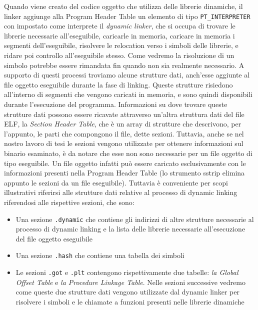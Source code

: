 Quando viene creato del codice oggetto che utilizza delle librerie
dinamiche, il linker aggiunge alla Program Header Table un elemento di
tipo \lstinline{PT_INTERPRETER} con impostato come interprete il
\emph{dynamic linker}, che si occupa di trovare le librerie necessarie
all'eseguibile, caricarle in memoria, caricare in memoria i segmenti
dell'eseguibile, risolvere le relocation verso i simboli delle
librerie, e ridare poi controllo all'eseguibile stesso. Come vedremo
la risoluzione di un simbolo potrebbe essere rimandata fin quando non
sia realmente necessario. A supporto di questi processi troviamo
alcune strutture dati, anch'esse aggiunte al file oggetto eseguibile
durante la fase di linking. Queste strutture risiedono all'interno di
segmenti che vengono caricati in memoria, e sono quindi disponibili
durante l'esecuzione del programma. Informazioni su dove trovare
queste strutture dati possono essere ricavate attraverso un'altra
struttura dati del file ELF, la \emph{Section Header Table}, che è un
array di strutture che descrivono, per l'appunto, le parti che
compongono il file, dette sezioni. Tuttavia, anche se nel nostro
lavoro di tesi le sezioni vengono utilizzate per ottenere informazioni
sul binario esaminato, è da notare che esse non sono necessarie per un
file oggetto di tipo eseguibile. Un file oggetto infatti può essere
caricato esclusivamente con le informazioni presenti nella Program
Header Table (lo strumento sstrip\cite{sstrip} elimina appunto le
sezioni da un file eseguibile). Tuttavia è conveniente per scopi
illustrativi riferirsi alle strutture dati relative al processo di
dynamic linking riferendosi alle rispettive sezioni, che sono:

\begin{itemize}

  \item Una sezione \lstinline{.dynamic} che contiene gli indirizzi di
    altre strutture necessarie al processo di dynamic linking e la
    lista delle librerie necessarie all'esecuzione del file oggetto
    eseguibile

  \item Una sezione \lstinline{.hash} che contiene una tabella dei
    simboli

  \item Le sezioni \lstinline{.got} e \lstinline{.plt} contengono
    rispettivamente due tabelle: \emph{la Global Offset Table} e
    \emph{la Procedure Linkage Table}. Nelle sezioni successive
    vedremo come queste due strutture dati vengono utilizzate dal
    dynamic linker per risolvere i simboli e le chiamate a funzioni
    presenti nelle librerie dinamiche

\end{itemize}

